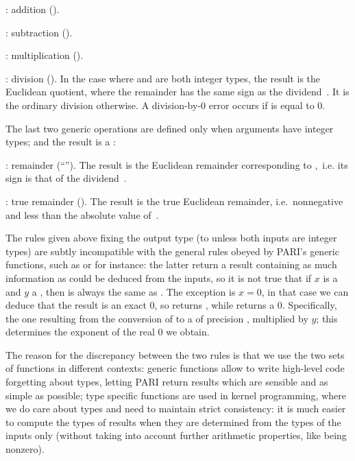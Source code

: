 \item {}: addition ().

\item {}: subtraction ().

\item {}: multiplication ().

\item {}: division (). In the case where  and 
are both integer types, the result is the Euclidean quotient, where the
remainder has the same sign as the dividend~. It is the ordinary
division otherwise. A division-by-$0$ error occurs if  is equal to
$0$.

The last two generic operations are defined only when arguments have integer
types; and the result is a :

\item {}: remainder (``''). The result is the Euclidean
remainder corresponding to ,~i.e. its sign is that of the
dividend~.

\item {}: true remainder (). The result is the true
Euclidean remainder, i.e.~nonnegative and less than the absolute value
of~.

 The rules given above fixing the output
type (to  unless both inputs are integer types) are subtly
incompatible with the general rules obeyed by PARI's generic functions, such
as  or  for instance: the latter return a result
containing as much information as could be deduced from the inputs, so it is
not true that if $x$ is a  and $y$ a , then
 is always the same as . The exception
is $x = 0$, in that case we can deduce that the result is an exact $0$,
so  returns , while  returns a
 $0$. Specifically, the one resulting from the conversion of
 to a  of precision , multiplied by
$y$; this determines the exponent of the real $0$ we obtain.

The reason for the discrepancy between the two rules is that we use the two
sets of functions in different contexts: generic functions allow to write
high-level code forgetting about types, letting PARI return results which are
sensible and as simple as possible; type specific functions are used in
kernel programming, where we do care about types and need to maintain strict
consistency: it is much easier to compute the types of results when they are
determined from the types of the inputs only (without taking into account
further arithmetic properties, like being nonzero).
\smallskip

